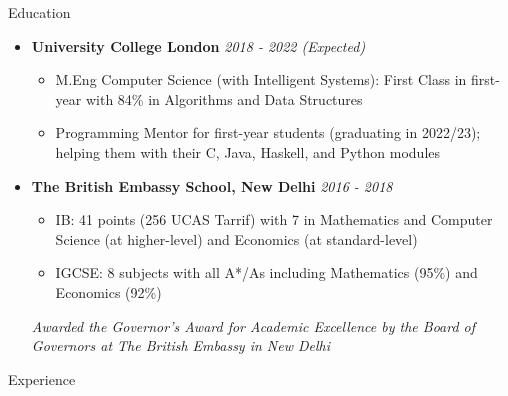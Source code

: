 \documentclass{resume}
\author{abir}
\begin{document}
\begin{rSection}{Education}
\begin{itemize}[leftmargin=0in]
\itemsep 0.3em
    \item[] \small{\textbf{University College London}} \hfill \small{\textit{2018 - 2022 (Expected)}}
    \begin{itemize}
        \item \footnotesize{M.Eng Computer Science (with Intelligent Systems): First Class in first-year with 84\% in Algorithms and Data Structures}
        \item \footnotesize{Programming Mentor for first-year students (graduating in 2022/23); helping them with their C, Java, Haskell, and Python modules}
    \end{itemize}
    \item[] \small{\textbf{The British Embassy School, New Delhi}} \hfill \small{\textit{2016 - 2018}}
    \begin{itemize}
        \item \footnotesize{IB: 41 points (256 UCAS Tarrif) with 7 in Mathematics and Computer Science (at higher-level) and Economics (at standard-level)}
        \item \footnotesize{IGCSE: 8 subjects with all A*/As including Mathematics (95\%) and Economics (92\%)}
    \end{itemize}
    \footnotesize{\textit{Awarded the Governor's Award for Academic Excellence by the Board of Governors at The British Embassy in New Delhi}}
\end{itemize}
\end{rSection}


\begin{rSection}{Experience}

\end{rSection}
\end{document}
